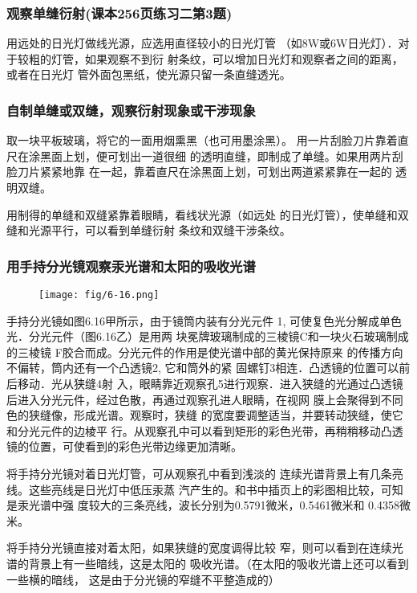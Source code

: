 \subsubsection{观察单缝衍射(课本256页练习二第3题)}
用远处的日光灯做线光源，应选用直径较小的日光灯管
（如8W或6W日光灯）．对于较粗的灯管，如果观察不到衍
射条纹，可以增加日光灯和观察者之间的距离，或者在日光灯
管外面包黑纸，使光源只留一条直缝透光。

\subsubsection{自制单缝或双缝，观察衍射现象或干涉现象}
取一块平板玻璃，将它的一面用烟熏黑（也可用墨涂黑）。
用一片刮脸刀片靠着直尺在涂黑面上划，便可划出一道很细
的透明直缝，即制成了单缝。如果用两片刮脸刀片紧紧地靠
在一起，靠着直尺在涂黑面上划，可划出两道紧紧靠在一起的
透明双缝。

用制得的单缝和双缝紧靠着眼睛，看线状光源（如远处
的日光灯管），使单缝和双缝和光源平行，可以看到单缝衍射
条纹和双缝干涉条纹。

\subsubsection{用手持分光镜观察汞光谱和太阳的吸收光谱}

\begin{figure}[htp]
    \centering
     \texttt{[image: fig/6-16.png]}
    \caption{}
\end{figure}

手持分光镜如图6.16甲所示，由于镜筒内装有分光元件
1, 可使复色光分解成单色光．分光元件（图6.16乙）是用两
块冕牌玻璃制成的三棱镜C和一块火石玻璃制成的三棱镜
F胶合而成。分光元件的作用是使光谱中部的黄光保持原来
的传播方向不偏转，筒内还有一个凸透镜2, 它和筒外的紧
固螺钉3相连．凸透镜的位置可以前后移动．光从狭缝4射
入，眼睛靠近观察孔5进行观察．进入狭缝的光通过凸透镜
后进入分光元件，经过色散，再通过观察孔进人眼睛，在视网
膜上会聚得到不同色的狭缝像，形成光谱。观察时，狭缝
的宽度要调整适当，并要转动狭缝，使它和分光元件的边棱平
行。从观察孔中可以看到矩形的彩色光带，再稍稍移动凸透
镜的位置，可使看到的彩色光带边缘更加清晰。

将手持分光镜对着日光灯管，可从观察孔中看到浅淡的
连续光谱背景上有几条亮线。这些亮线是日光灯中低压汞蒸
汽产生的。和书中插页上的彩图相比较，可知是汞光谱中强
度较大的三条亮线，波长分别为0.5791微米，0.5461微米和
0.4358微米。

将手持分光镜直接对着太阳，如果狭缝的宽度调得比较
窄，则可以看到在连续光谱的背景上有一些暗线，这是太阳的
吸收光谱。（在太阳的吸收光谱上还可以看到一些横的暗线，
这是由于分光镜的窄缝不平整造成的）



